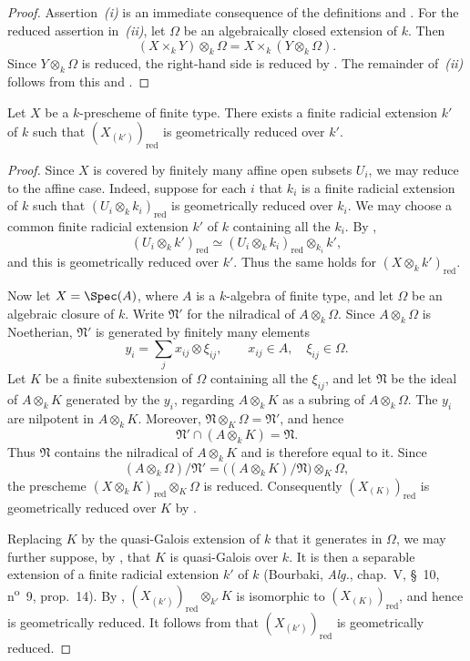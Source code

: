 \begin{proof}
Assertion~\emph{(i)} is an immediate consequence of the definitions
and .
For the reduced assertion in~\emph{(ii)}, let $\Omega$ be an
algebraically closed extension of $k$.
Then
\[
 (X\times_kY)\otimes_k\Omega
 =X\times_k(Y\otimes_k\Omega).
\]
Since $Y\otimes_k\Omega$ is reduced, the right-hand side is reduced by
.
The remainder of~\emph{(ii)} follows from this and
.
\end{proof}

\begin{proposition}[4.6.6]
\label{IV.4.6.6}
Let $X$ be a $k$-prescheme of finite type.
There exists a finite radicial extension $k'$ of $k$ such that
$(X_{(k')})_{\mathrm{red}}$ is geometrically reduced over $k'$.
\end{proposition}

\begin{proof}
Since $X$ is covered by finitely many affine open subsets $U_i$, we
may reduce to the affine case.
Indeed, suppose for each $i$ that $k_i$ is a finite radicial extension
of $k$ such that
$(U_i\otimes_k k_i)_{\mathrm{red}}$ is geometrically reduced over
$k_i$.
We may choose a common finite radicial extension $k'$ of $k$ containing
all the $k_i$.
By ,
\[
 (U_i\otimes_k k')_{\mathrm{red}}
 \simeq
 (U_i\otimes_k k_i)_{\mathrm{red}}\otimes_{k_i}k',
\]
and this is geometrically reduced over $k'$.
Thus the same holds for $(X\otimes_k k')_{\mathrm{red}}$.

Now let $X=\Spec(A)$, where $A$ is a $k$-algebra of finite type, and
let $\Omega$ be an algebraic closure of $k$.
Write $\mathfrak N'$ for the nilradical of $A\otimes_k\Omega$.
Since $A\otimes_k\Omega$ is Noetherian, $\mathfrak N'$ is generated by
finitely many elements
\[
 y_i=\sum_j x_{ij}\otimes\xi_{ij},
 \qquad x_{ij}\in A,\quad \xi_{ij}\in\Omega.
\]
Let $K$ be a finite subextension of $\Omega$ containing all the
$\xi_{ij}$, and let $\mathfrak N$ be the ideal of $A\otimes_kK$
generated by the $y_i$, regarding $A\otimes_kK$ as a subring of
$A\otimes_k\Omega$.
The $y_i$ are nilpotent in $A\otimes_kK$.
Moreover,
$\mathfrak N\otimes_K\Omega=\mathfrak N'$, and hence
\[
 \mathfrak N'\cap(A\otimes_kK)=\mathfrak N.
\]
Thus $\mathfrak N$ contains the nilradical of $A\otimes_kK$ and is
therefore equal to it.
Since
\[
 (A\otimes_k\Omega)/\mathfrak N'
 =
 \bigl((A\otimes_kK)/\mathfrak N\bigr)\otimes_K\Omega,
\]
the prescheme
$(X\otimes_kK)_{\mathrm{red}}\otimes_K\Omega$ is reduced.
Consequently $(X_{(K)})_{\mathrm{red}}$ is geometrically reduced over
$K$ by .

Replacing $K$ by the quasi-Galois extension of $k$ that it generates
in $\Omega$, we may further suppose, by , that $K$ is
quasi-Galois over $k$.
It is then a separable extension of a finite radicial extension $k'$
of $k$ (Bourbaki, \emph{Alg.}, chap.~V, \S~10,
n\textsuperscript{o}~9, prop.~14).
By ,
$(X_{(k')})_{\mathrm{red}}\otimes_{k'}K$ is isomorphic to
$(X_{(K)})_{\mathrm{red}}$, and hence is geometrically reduced.
It follows from  that
$(X_{(k')})_{\mathrm{red}}$ is geometrically reduced.
\end{proof}

